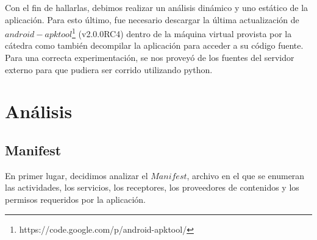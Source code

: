 \documentclass[10pt, a4paper]{article}
\begin{document}
Con el fin de hallarlas, debimos realizar un análisis dinámico y uno estático de la aplicación. Para esto último, fue necesario descargar la última actualización de $android-apktool$\footnote{https://code.google.com/p/android-apktool/} (v2.0.0RC4) dentro de la máquina virtual provista por la cátedra como también decompilar la aplicación para acceder a su código fuente.
Para una correcta experimentación, se nos proveyó de los fuentes del servidor externo para que pudiera ser corrido utilizando python.

\newpage
\section{Análisis}

\subsection{Manifest}

En primer lugar, decidimos analizar el $Manifest$, archivo en el que se enumeran las actividades, los servicios, los receptores, los proveedores de contenidos y los permisos requeridos por la aplicación. 
\end{document}
